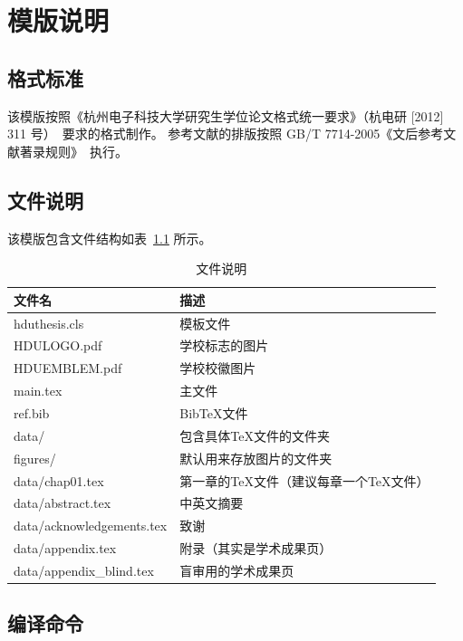 
\chapter{模版说明}

\section{格式标准}

该模版按照《杭州电子科技大学研究生学位论文格式统一要求》（杭电研 [2012] 311 号）~\cite{hdy2012311}要求的格式制作。
参考文献的排版按照 GB/T 7714-2005《文后参考文献著录规则》~\cite{gbt7714-2005}执行。

\section{文件说明}

该模版包含文件结构如表~\ref{tab:file} 所示。

\begin{table}[htp]
    \centering
    \caption{文件说明}
    \begin{tabularx}{\linewidth}{Xl}
      \toprule
      文件名          & 描述                         \\
      \midrule
      hduthesis.cls   & 模板文件                     \\
      HDULOGO.pdf     & 学校标志的图片 \\
      HDUEMBLEM.pdf   & 学校校徽图片 \\
      main.tex & 主文件 \\
      ref.bib & BibTeX文件    \\
      data/ & 包含具体TeX文件的文件夹 \\
      figures/ & 默认用来存放图片的文件夹 \\
      data/chap01.tex & 第一章的TeX文件（建议每章一个TeX文件）\\
      data/abstract.tex & 中英文摘要 \\
      data/acknowledgements.tex & 致谢 \\
      data/appendix.tex & 附录（其实是学术成果页） \\
      data/appendix\_blind.tex & 盲审用的学术成果页 \\
      \bottomrule
    \end{tabularx}
    \label{tab:file}
  \end{table}


\section{编译命令}


